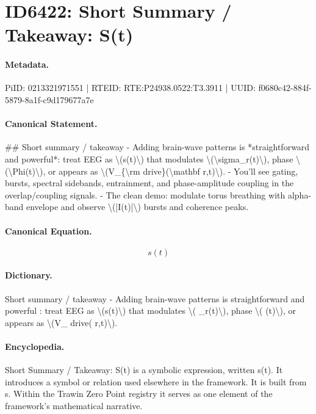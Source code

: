 \section*{ID6422: Short Summary / Takeaway: S(t)}
\paragraph{Metadata.}
PiID: 0213321971551 | RTEID: RTE:P24938.0522:T3.3911 | UUID: f0680c42-884f-5879-8a1f-c9d179677a7e

\paragraph{Canonical Statement.}
\#\# Short summary / takeaway - Adding brain-wave patterns is *straightforward and powerful*: treat EEG as \textbackslash{}(s(t)\textbackslash{}) that modulates \textbackslash{}(\textbackslash{}sigma\_r(t)\textbackslash{}), phase \textbackslash{}(\textbackslash{}Phi(t)\textbackslash{}), or appears as \textbackslash{}(V\_\{\textbackslash{}rm drive\}(\textbackslash{}mathbf r,t)\textbackslash{}). - You’ll see gating, bursts, spectral sidebands, entrainment, and phase-amplitude coupling in the overlap/coupling signals. - The clean demo: modulate torus breathing with alpha-band envelope and observe \textbackslash{}(|I(t)|\textbackslash{}) bursts and coherence peaks.

\paragraph{Canonical Equation.}
\[
s(t)
\]

\paragraph{Dictionary.}
Short summary / takeaway - Adding brain-wave patterns is straightforward and powerful : treat EEG as \textbackslash{}(s(t)\textbackslash{}) that modulates \textbackslash{}( \_r(t)\textbackslash{}), phase \textbackslash{}( (t)\textbackslash{}), or appears as \textbackslash{}(V\_ drive( r,t)\textbackslash{}).

\paragraph{Encyclopedia.}
Short Summary / Takeaway: S(t) is a symbolic expression, written s(t). It introduces a symbol or relation used elsewhere in the framework. It is built from s. Within the Trawin Zero Point registry it serves as one element of the framework's mathematical narrative.
